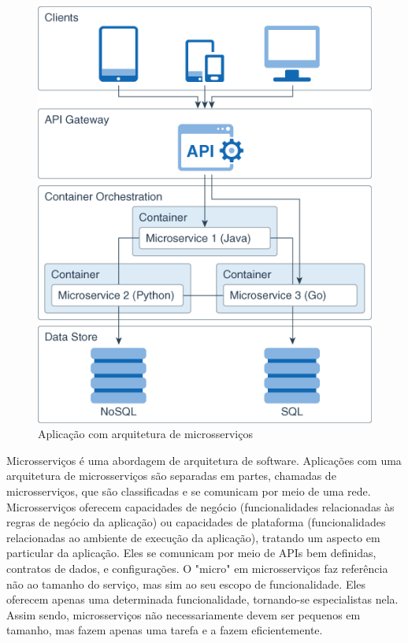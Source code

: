 \begin{figure}[htb]
	\caption{\label{figura_arquitetura_microsservicos}Aplicação com arquitetura de microsserviços}
	\begin{center}
	    \includegraphics[scale=0.5]{Imagens/microservice_architecture.png}
	\end{center}
\end{figure}

Microsserviços é uma abordagem de arquitetura de software. Aplicações com uma arquitetura de microsserviços são separadas em partes, chamadas de microsserviços, que são classificadas e se comunicam por meio de uma rede. Microsserviços oferecem capacidades de negócio (funcionalidades relacionadas às regras de negócio da aplicação) ou capacidades de plataforma (funcionalidades relacionadas ao ambiente de execução da aplicação), tratando um aspecto em particular da aplicação. Eles se comunicam por meio de APIs bem definidas, contratos de dados, e configurações. O "micro" em microsserviços faz referência não ao tamanho do serviço, mas sim ao seu escopo de funcionalidade. Eles oferecem apenas uma determinada funcionalidade, tornando-se especialistas nela. Assim sendo, microsserviços não necessariamente devem ser pequenos em tamanho, mas fazem apenas uma tarefa e a fazem eficientemente. \cite{Familiar2015}
 
